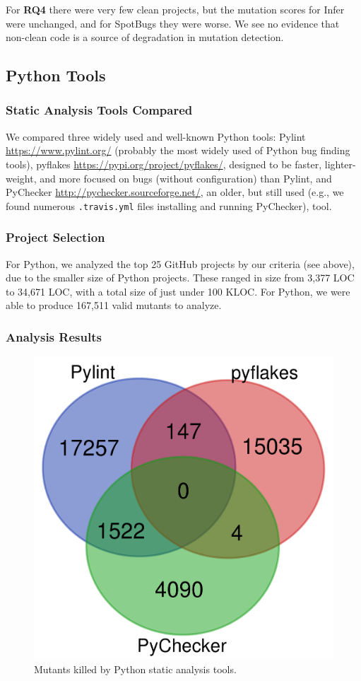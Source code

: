 For {\bf RQ4} there were very few clean projects, but the mutation scores for Infer were unchanged, and for SpotBugs they were worse.  We see no evidence that non-clean code is a source of degradation in mutation detection.


\subsection{Python Tools}

\subsubsection{Static Analysis Tools Compared}

We compared three widely used and well-known Python tools:  Pylint \url{https://www.pylint.org/} (probably the most widely used of Python bug finding tools), pyflakes \url{https://pypi.org/project/pyflakes/}, designed to be faster, lighter-weight, and more focused on bugs (without configuration) than Pylint, and PyChecker \url{http://pychecker.sourceforge.net/}, an older, but still used (e.g., we found numerous {\tt .travis.yml} files installing and running PyChecker), tool.

\subsubsection{Project Selection}

For Python, we analyzed the top 25 GitHub projects by our criteria (see above), due to the smaller size of Python projects.  These ranged in size from 3,377 LOC to 34,671 LOC, with a total size of just under 100 KLOC.  For Python, we were able to produce 167,511 valid mutants to analyze.

\subsubsection{Analysis Results}


\begin{figure}
  \includegraphics[width=0.6\columnwidth]{python.png}
  \caption{Mutants killed by Python static analysis tools.}
  \label{fig:pythonvenn}
\end{figure}

